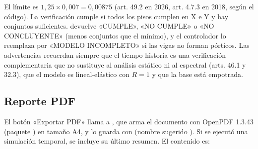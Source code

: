 El límite es $1{,}25 \times 0{,}007 = 0{,}00875$ (art. 49.2 en 2026, art. 4.7.3 en 2018, según el código). La
verificación cumple si todos los pisos cumplen en X e Y y hay conjuntos suficientes. 
devuelve «CUMPLE», «NO CUMPLE» o «NO CONCLUYENTE» (menos conjuntos que el mínimo), y el controlador lo reemplaza por
«MODELO INCOMPLETO» si las vigas no forman pórticos. Las advertencias recuerdan siempre que el tiempo-historia es una
verificación complementaria que no sustituye al análisis estático ni al espectral (arts. 46.1 y 32.3), que el modelo es
lineal-elástico con $R = 1$ y que la base está empotrada.

\subsection{Reporte PDF}
\label{sec:sis-pdf}

El botón «Exportar PDF» llama a , que
arma el documento con OpenPDF 1.3.43 (paquete ) en tamaño A4, y lo guarda con
 (nombre sugerido ). Si se ejecutó una simulación
temporal, se incluye su último resumen. El contenido es:

